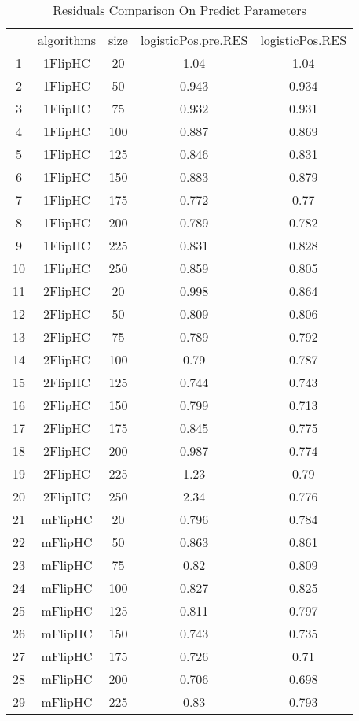 \begin{table}[hbtp]
\caption{Residuals Comparison On Predict Parameters}
\centering
\begin{tabular}{|ccccc|}
\hline
 & algorithms & size & logisticPos.pre.RES & logisticPos.RES \\
   1 & 1FlipHC &   20 & 1.04 & 1.04 \\
   2 & 1FlipHC &   50 & 0.943 & 0.934 \\
   3 & 1FlipHC &   75 & 0.932 & 0.931 \\
   4 & 1FlipHC &  100 & 0.887 & 0.869 \\
   5 & 1FlipHC &  125 & 0.846 & 0.831 \\
   6 & 1FlipHC &  150 & 0.883 & 0.879 \\
   7 & 1FlipHC &  175 & 0.772 & 0.77 \\
   8 & 1FlipHC &  200 & 0.789 & 0.782 \\
   9 & 1FlipHC &  225 & 0.831 & 0.828 \\
  10 & 1FlipHC &  250 & 0.859 & 0.805 \\
  11 & 2FlipHC &   20 & 0.998 & 0.864 \\
  12 & 2FlipHC &   50 & 0.809 & 0.806 \\
  13 & 2FlipHC &   75 & 0.789 & 0.792 \\
  14 & 2FlipHC &  100 & 0.79 & 0.787 \\
  15 & 2FlipHC &  125 & 0.744 & 0.743 \\
  16 & 2FlipHC &  150 & 0.799 & 0.713 \\
  17 & 2FlipHC &  175 & 0.845 & 0.775 \\
  18 & 2FlipHC &  200 & 0.987 & 0.774 \\
  19 & 2FlipHC &  225 & 1.23 & 0.79 \\
  20 & 2FlipHC &  250 & 2.34 & 0.776 \\
  21 & mFlipHC &   20 & 0.796 & 0.784 \\
  22 & mFlipHC &   50 & 0.863 & 0.861 \\
  23 & mFlipHC &   75 & 0.82 & 0.809 \\
  24 & mFlipHC &  100 & 0.827 & 0.825 \\
  25 & mFlipHC &  125 & 0.811 & 0.797 \\
  26 & mFlipHC &  150 & 0.743 & 0.735 \\
  27 & mFlipHC &  175 & 0.726 & 0.71 \\
  28 & mFlipHC &  200 & 0.706 & 0.698 \\
  29 & mFlipHC &  225 & 0.83 & 0.793 \\

\end{tabular}
\end{table}
